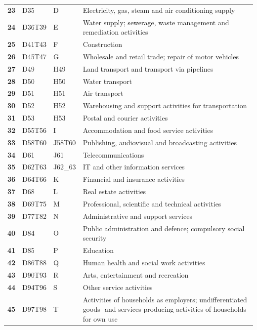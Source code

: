\documentclass[preprint, 3p,
authoryear]{elsarticle} %
\begin{document}
\begin{table}[H]
{\begin{tabular}{l|llp{8cm}}
\textbf{23} & D35 & D & Electricity, gas, steam and air conditioning supply\\
\textbf{24} & D36T39 & E & Water supply; sewerage, waste management and remediation activities\\
\textbf{25} & D41T43 & F & Construction\\
\textbf{26} & D45T47 & G & Wholesale and retail trade; repair of motor vehicles\\
\textbf{27} & D49 & H49 & Land transport and transport via pipelines\\
\textbf{28} & D50 & H50 & Water transport\\
\textbf{29} & D51 & H51 & Air transport\\
\textbf{30} & D52 & H52 & Warehousing and support activities for transportation\\
\textbf{31} & D53 & H53 & Postal and courier activities\\
\textbf{32} & D55T56 & I & Accommodation and food service activities\\
\textbf{33} & D58T60 & J58T60 & Publishing, audiovisual and broadcasting activities\\
\textbf{34} & D61 & J61 & Telecommunications\\
\textbf{35} & D62T63 & J62\_63 & IT and other information services\\
\textbf{36} & D64T66 & K & Financial and insurance activities\\
\textbf{37} & D68 & L & Real estate activities\\
\textbf{38} & D69T75 & M & Professional, scientific and technical activities\\
\textbf{39} & D77T82 & N & Administrative and support services\\
\textbf{40} & D84 & O & Public administration and defence; compulsory social security\\
\textbf{41} & D85 & P & Education\\
\textbf{42} & D86T88 & Q & Human health and social work activities\\
\textbf{43} & D90T93 & R & Arts, entertainment and recreation\\
\textbf{44} & D94T96 & S & Other service activities\\
\textbf{45} & D97T98 & T & Activities of households as employers; undifferentiated goods- and services-producing activities of households for own use\\
\bottomrule
\end{tabular}}
\end{table}
\end{document}
